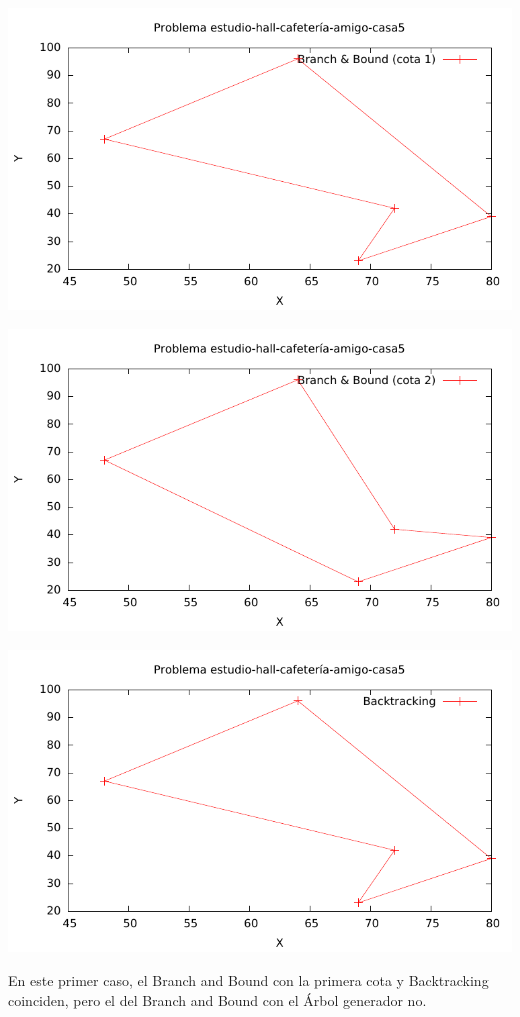 \includegraphics[width=15cm]{img/e-h-c-a-c5_tsp_1}

\includegraphics[width=15cm]{img/e-h-c-a-c5_tsp_2}

\includegraphics[width=15cm]{img/e-h-c-a-c5_tsp_3}

En este primer caso, el Branch and Bound con la primera cota y Backtracking coinciden, pero el del Branch and Bound con el Árbol generador no.

